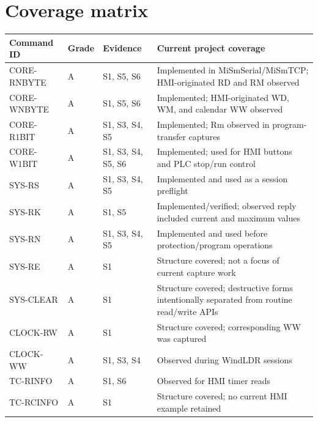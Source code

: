 \documentclass[10pt,letterpaper]{article}
\begin{document}
\section{Coverage matrix}
\begin{longtable}{@{}p{3.5cm}p{1.2cm}p{3.2cm}p{8.0cm}@{}}
\toprule
Command ID & Grade & Evidence & Current project coverage \\
\midrule


CORE-RNBYTE & A & S1, S5, S6 & Implemented in MiSmSerial/MiSmTCP; HMI-originated RD and RM observed \\

CORE-WNBYTE & A & S1, S5, S6 & Implemented; HMI-originated WD, WM, and calendar WW observed \\

CORE-R1BIT & A & S1, S3, S4, S5 & Implemented; Rm observed in program-transfer captures \\

CORE-W1BIT & A & S1, S3, S4, S5, S6 & Implemented; used for HMI buttons and PLC stop/run control \\

SYS-RS & A & S1, S3, S4, S5 & Implemented and used as a session preflight \\

SYS-RK & A & S1, S5 & Implemented/verified; observed reply included current and maximum values \\

SYS-RN & A & S1, S3, S4, S5 & Implemented and used before protection/program operations \\

SYS-RE & A & S1 & Structure covered; not a focus of current capture work \\

SYS-CLEAR & A & S1 & Structure covered; destructive forms intentionally separated from routine read/write APIs \\

CLOCK-RW & A & S1 & Structure covered; corresponding WW was captured \\

CLOCK-WW & A & S1, S3, S4 & Observed during WindLDR sessions \\

TC-RINFO & A & S1, S6 & Observed for HMI timer reads \\

TC-RCINFO & A & S1 & Structure covered; no current HMI example retained \\


\end{longtable}
\end{document}
